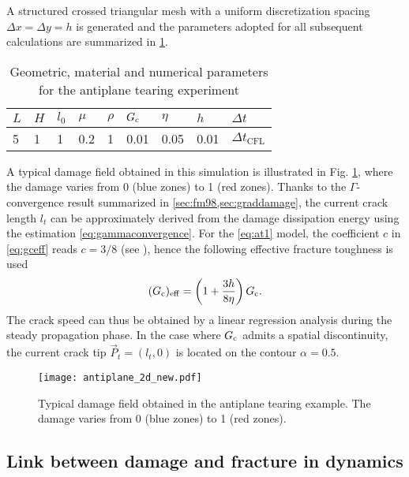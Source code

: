 A structured crossed triangular mesh with a uniform discretization spacing $\Delta x=\Delta y=h$ is generated and the parameters adopted for all subsequent calculations are summarized in \cref{tab:paraanti}.
\begin{table}[htbp]
\centering
\caption{Geometric, material and numerical parameters for the antiplane tearing experiment} \label{tab:paraanti}
\begin{tabular}{lllllllll} \toprule
$L$ & $H$ & $l_0$ & $\mu$ & $\rho$ & $G_\mathrm{c}$ & $\eta$ & $h$ & $\Delta t$\\ \midrule
5 & 1 & 1 & 0.2 & 1 & 0.01 & 0.05 & 0.01 & $\Delta t_\mathrm{CFL}$ \\ \bottomrule
\end{tabular}
\end{table}
A typical damage field obtained in this simulation is illustrated in Fig. \ref{fig:antiplane_2d_new}, where the damage varies from 0 (blue zones) to 1 (red zones). Thanks to the $\Gamma$-convergence result summarized in \cref{sec:fm98,sec:graddamage}, the current crack length $l_t$ can be approximately derived from the damage dissipation energy using the estimation \eqref{eq:gammaconvergence}. For the \eqref{eq:at1} model, the coefficient $c$ in \eqref{eq:gceff} reads $c=3/8$ (see \cite{HossainHsuehBourdinBhattachary:2014}), hence the following effective fracture toughness is used
\[
(G_\mathrm{c})_\mathrm{eff}=\left(1+\frac{3h}{8\eta}\right)G_\mathrm{c}.
\]
The crack speed can thus be obtained by a linear regression analysis during the steady propagation phase. In the case where $G_\mathrm{c}$ admits a spatial discontinuity, the current crack tip $\vec{P}_t=(l_t,0)$ is located on the contour $\alpha=0.5$.
\begin{figure}[htbp]
\centering
\texttt{[image: antiplane\_2d\_new.pdf]}
\caption{Typical damage field obtained in the antiplane tearing example. The damage varies from 0 (blue zones) to 1 (red zones).} \label{fig:antiplane_2d_new}
\end{figure}

\subsection{Link between damage and fracture in dynamics} \label{sec:homo}
